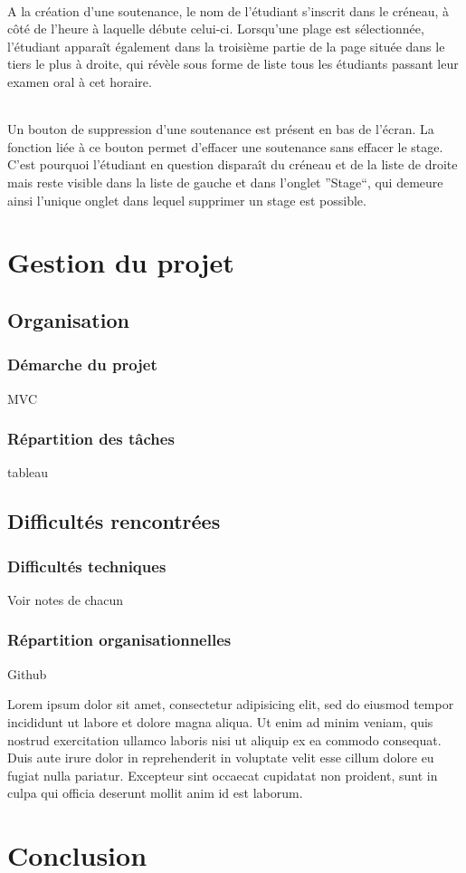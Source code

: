 \documentclass[a4paper,10pt]{report}
\begin{document}
		\paragraph{}
		  A la création d'une soutenance, le nom de l'étudiant s'inscrit dans le créneau, à côté de l'heure à laquelle débute celui-ci.
		  Lorsqu'une plage est sélectionnée, l'étudiant apparaît également dans la troisième partie de la page située dans le tiers le plus à droite, qui révèle sous forme de liste tous les étudiants passant leur examen oral à cet horaire.
		  
		\paragraph{}
		  Un bouton de suppression d'une soutenance est présent en bas de l'écran.
		  La fonction liée à ce bouton permet d'effacer une soutenance sans effacer le stage.
		  C'est pourquoi l'étudiant en question disparaît du créneau et de la liste de droite mais reste visible dans la liste de gauche et dans l'onglet ''Stage``, qui demeure ainsi l'unique onglet dans lequel supprimer un stage est possible.
		  
		  
\part{Gestion du projet}
  \chapter{Organisation}
    \section{Démarche du projet}
      MVC
    \section{Répartition des tâches}
      tableau
  \chapter{Difficultés rencontrées}
    \section{Difficultés techniques}
      Voir notes de chacun
    \section{Répartition organisationnelles}
      Github
    
Lorem ipsum dolor sit amet, consectetur adipisicing elit, sed do eiusmod tempor incididunt ut labore et dolore magna aliqua. Ut enim ad minim veniam, quis nostrud exercitation ullamco laboris nisi ut aliquip ex ea commodo consequat. Duis aute irure dolor in reprehenderit in voluptate velit esse cillum dolore eu fugiat nulla pariatur. Excepteur sint occaecat cupidatat non proident, sunt in culpa qui officia deserunt mollit anim id est laborum.

\part{Conclusion}
\end{document}
